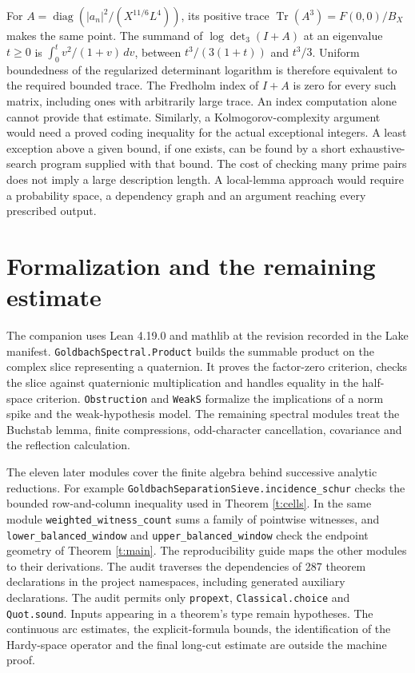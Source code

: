 \documentclass[11pt,a4paper]{article}
\begin{document}
For \(A=\operatorname{diag}(|a_n|^2/(X^{11/6}L^4))\), its positive trace \(\operatorname{Tr}(A^3)=F(0,0)/B_X\) makes the same point. The summand of \(\log\det_3(I+A)\) at an eigenvalue \(t\ge0\) is \(\int_0^t v^2/(1+v)\,dv\), between \(t^3/(3(1+t))\) and \(t^3/3\). Uniform boundedness of the regularized determinant logarithm is therefore equivalent to the required bounded trace. The Fredholm index of \(I+A\) is zero for every such matrix, including ones with arbitrarily large trace. An index computation alone cannot provide that estimate. Similarly, a Kolmogorov-complexity argument would need a proved coding inequality for the actual exceptional integers. A least exception above a given bound, if one exists, can be found by a short exhaustive-search program supplied with that bound. The cost of checking many prime pairs does not imply a large description length. A local-lemma approach would require a probability space, a dependency graph and an argument reaching every prescribed output.

\section{Formalization and the remaining estimate}
The companion uses Lean 4.19.0 and mathlib at the revision recorded in the Lake manifest. \texttt{GoldbachSpectral.Product} builds the summable product on the complex slice representing a quaternion. It proves the factor-zero criterion, checks the slice against quaternionic multiplication and handles equality in the half-space criterion. \texttt{Obstruction} and \texttt{WeakS} formalize the implications of a norm spike and the weak-hypothesis model. The remaining spectral modules treat the Buchstab lemma, finite compressions, odd-character cancellation, covariance and the reflection calculation.

The eleven later modules cover the finite algebra behind successive analytic reductions. For example \texttt{GoldbachSeparationSieve.incidence\_schur} checks the bounded row-and-column inequality used in Theorem \ref{t:cells}. In the same module \texttt{weighted\_witness\_count} sums a family of pointwise witnesses, and \texttt{lower\_balanced\_window} and \texttt{upper\_balanced\_window} check the endpoint geometry of Theorem \ref{t:main}. The reproducibility guide maps the other modules to their derivations. The audit traverses the dependencies of 287 theorem declarations in the project namespaces, including generated auxiliary declarations. The audit permits only \texttt{propext}, \texttt{Classical.choice} and \texttt{Quot.sound}. Inputs appearing in a theorem's type remain hypotheses. The continuous arc estimates, the explicit-formula bounds, the identification of the Hardy-space operator and the final long-cut estimate are outside the machine proof.
\end{document}
